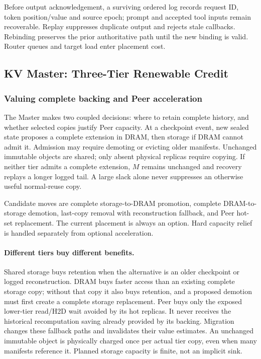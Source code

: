 Before output acknowledgement, a surviving ordered log records request
ID, token position/value and source epoch; prompt and accepted tool inputs
remain recoverable. Replay suppresses duplicate output and rejects stale
callbacks. Rebinding preserves the prior authoritative path until the new
binding is valid. Router queues and target load enter placement cost.

\subsection{KV Master: Three-Tier Renewable Credit}
\label{sec:kv-master}

\subsubsection{Valuing complete backing and Peer acceleration}
\label{sec:placement-value}

The Master makes two coupled decisions: where to retain complete history,
and whether selected copies justify Peer capacity. At a checkpoint event,
new sealed state proposes a complete extension in DRAM, then storage if
DRAM cannot admit it. Admission may require demoting or evicting older
manifests. Unchanged immutable objects are shared; only absent physical
replicas require copying. If neither tier admits a complete extension,
$M$ remains unchanged and recovery replays a longer logged tail. A large
slack alone never suppresses an otherwise useful normal-reuse copy.

Candidate moves are complete storage-to-DRAM promotion, complete
DRAM-to-storage demotion, last-copy removal with reconstruction fallback,
and Peer hot-set replacement. The current placement is always an option.
Hard capacity relief is handled separately from optional acceleration.

\paragraph{Different tiers buy different benefits.}
Shared storage buys retention when the alternative is an older checkpoint
or logged reconstruction. DRAM buys faster access than an existing
complete storage copy; without that copy it also buys retention, and a
proposed demotion must first create a complete storage replacement.
Peer buys only the exposed lower-tier read/H2D wait avoided by its hot
replicas. It never receives the historical recomputation saving already
provided by its backing. Migration changes these fallback paths and
invalidates their value estimates. An unchanged immutable object is
physically charged once per actual tier copy, even when many manifests
reference it. Planned storage capacity is finite, not an implicit sink.

